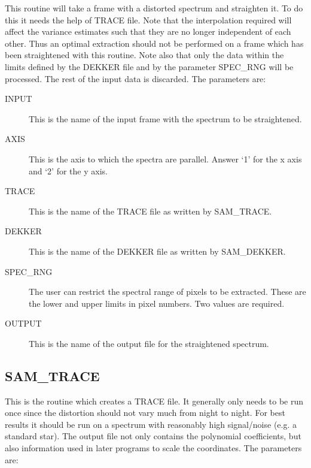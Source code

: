 This routine will take a frame with a distorted spectrum and straighten it. To
do this it needs the help of TRACE file.  Note that the interpolation required
will affect the variance estimates such that they are no longer independent of
each other.  Thus an optimal extraction should not be  performed on a frame
which has been straightened with this routine.  Note also that only the data
within the limits defined by the DEKKER file and by the parameter SPEC\_RNG
will be processed.  The rest of the input data is discarded. The parameters
are:

\begin{description}

\item[INPUT] This is the name of the input frame with the spectrum to be
straightened.

\item[AXIS] This is the axis to which the spectra are parallel.  Answer `1' for
the x axis and `2' for the y axis.

\item[TRACE] This is the name of the TRACE file as written by SAM\_TRACE.

\item[DEKKER] This is the name of the DEKKER file as written by SAM\_DEKKER.

\item[SPEC\_RNG] The user can restrict the spectral range of pixels to be extracted.
These are the lower and upper limits in pixel numbers.  Two values are
required.

\item[OUTPUT] This is the name of the output file for the straightened
spectrum.

\end{description}

\subsection{SAM\_TRACE}

This is the routine which creates a TRACE file.  It generally only needs to be
run once since the distortion should not vary much from night to night.  For
best results it should be run on a spectrum with reasonably high  signal/noise
(e.g. a standard star).  The output file not only contains the polynomial
coefficients, but also information used in later programs to scale the
coordinates.  The parameters are:

